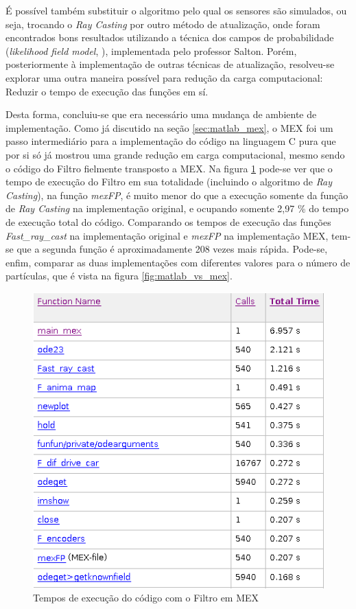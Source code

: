 \documentclass[
	12pt,				%
	openright,			%
	oneside,			%
	a4paper,			%
	english,			%
	french,				%
	spanish,			%
	brazil,				%
	]{abntex2}
\begin{document}
É possível também substituir o algoritmo pelo qual os sensores são simulados, ou seja, trocando o \emph{Ray Casting} por outro método de atualização, onde foram encontrados bons resultados utilizando a técnica dos campos de probabilidade (\emph{likelihood field model}, \cite{THR05}), implementada pelo professor Salton.
Porém, posteriormente à implementação de outras técnicas de atualização, resolveu-se explorar uma outra maneira possível para redução da carga computacional: Reduzir o tempo de execução das funções em sí.\par

Desta forma, concluiu-se que era necessário uma mudança de ambiente de implementação. Como já discutido na seção \ref{sec:matlab_mex}, o MEX foi um passo intermediário para a implementação do código na linguagem C pura que por si só já mostrou uma grande redução em carga computacional, mesmo sendo o código do Filtro fielmente transposto a MEX. Na figura \ref{fig:mex_profile} pode-se ver que o tempo de execução do Filtro em sua totalidade (incluindo o algoritmo de \emph{Ray Casting}), na função \emph{mexFP}, é muito menor do que a execução somente da função de \emph{Ray Casting} na implementação original, e ocupando somente 2,97 \% do tempo de execução total do código. Comparando os tempos de execução das funções \emph{Fast\_ray\_cast} na implementação original e \emph{mexFP} na implementação MEX, tem-se que a segunda função é aproximadamente 208 vezes mais rápida. Pode-se, enfim, comparar as duas implementações com diferentes valores para o número de partículas, que é vista na figura \ref{fig:matlab_vs_mex}.

\begin{figure}[h!]
    \centering
    \includegraphics[scale=0.5]{figs/mex_profile}
    \caption{Tempos de execução do código com o Filtro em MEX}
    \label{fig:mex_profile}
\end{figure}
\end{document}
